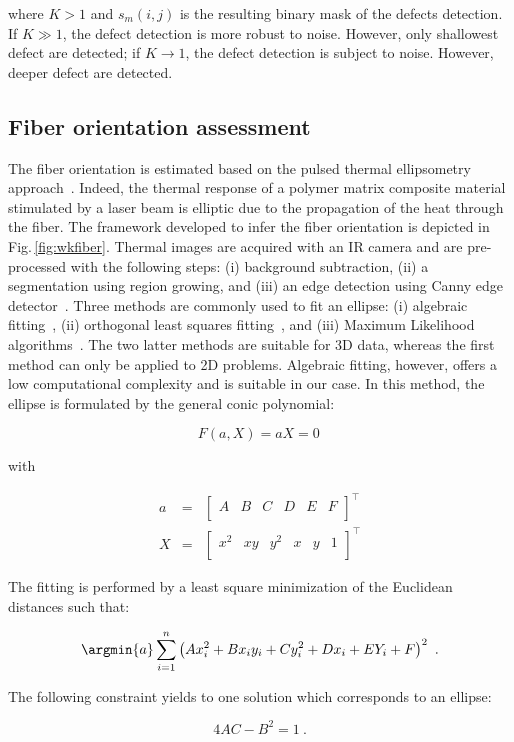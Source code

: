 \noindent where $K > 1$ and $s_m(i,j)$ is the resulting binary mask of the defects detection.
If $K \gg 1$, the defect detection is more robust to noise. However, only shallowest defect are detected; if $K \to 1$, the defect detection is subject to noise. However, deeper defect are detected.

\subsection{Fiber orientation assessment}\label{subsec:32}


The fiber orientation is estimated based on the pulsed thermal ellipsometry approach~\cite{Cielo1987}.
Indeed, the thermal response of a polymer matrix composite material stimulated by a laser beam is elliptic due to the propagation of the heat through the fiber.
The framework developed to infer the fiber orientation is depicted in Fig.\,\ref{fig:wkfiber}.
Thermal images are acquired with an IR camera and are pre-processed with the following steps: (i) background subtraction, (ii) a segmentation using region growing, and (iii) an edge detection using Canny edge detector~\cite{Canny1986}. 
Three methods are commonly used to fit an ellipse: (i) algebraic fitting~\cite{Fitzgibbon1999}, (ii) orthogonal least squares fitting~\cite{Ahn2001}, and (iii) Maximum Likelihood algorithms~\cite{Chojnacki2000}. 
The two latter methods are suitable for 3D data, whereas the first method can only be applied to 2D problems.
Algebraic fitting, however, offers a low computational complexity and is suitable in our case.
In this method, the ellipse is formulated by the general conic polynomial:

\begin{equation}
  \label{eq:4}
  F(a, X) = aX = 0 \,
\end{equation}

\noindent with 

\begin{eqnarray}
  a & = & \begin{bmatrix} A & B & C & D & E & F \\ \end{bmatrix}^\intercal \nonumber\\
  X & = & \begin{bmatrix} x^2 & xy & y^2 & x & y & 1 \\ \end{bmatrix}^\intercal \nonumber
\end{eqnarray}

The fitting is performed by a least square minimization of the Euclidean distances such that:

\begin{equation}
  \argmin{a} \sum_{i=1}^{n} \left( A x_i^2 + B x_i y_i + C y_i^2 + D x_i + E Y_i + F \right)^2 \ .
\end{equation}

The following constraint yields to one solution which corresponds to an ellipse:

\begin{equation}
  4AC - B^2 = 1 \ .
\end{equation}
